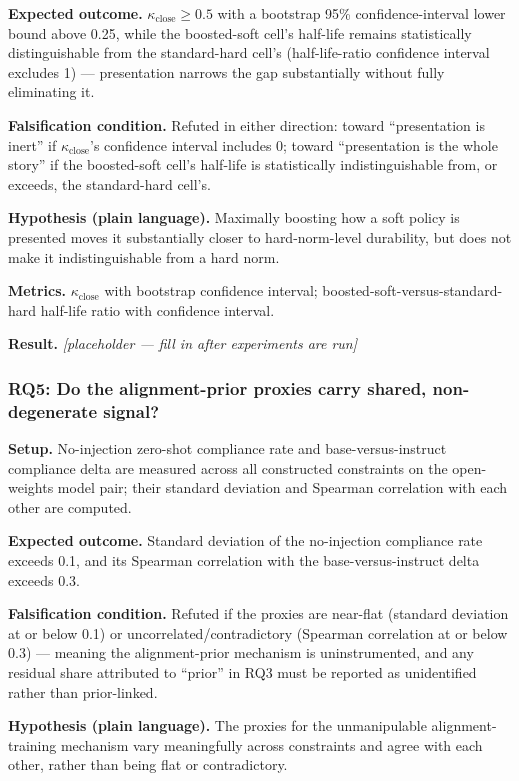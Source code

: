 \documentclass[11pt]{article}
\newcommand{\ph}{\textit{[placeholder --- fill in after experiments are run]}}
\begin{document}
\textbf{Expected outcome.} $\kappa_{\text{close}} \geq 0.5$ with a bootstrap 95\% confidence-interval lower bound above 0.25, while the boosted-soft cell's half-life remains statistically distinguishable from the standard-hard cell's (half-life-ratio confidence interval excludes 1) --- presentation narrows the gap substantially without fully eliminating it.

\textbf{Falsification condition.} Refuted in either direction: toward ``presentation is inert'' if $\kappa_{\text{close}}$'s confidence interval includes 0; toward ``presentation is the whole story'' if the boosted-soft cell's half-life is statistically indistinguishable from, or exceeds, the standard-hard cell's.

\textbf{Hypothesis (plain language).} Maximally boosting how a soft policy is presented moves it substantially closer to hard-norm-level durability, but does not make it indistinguishable from a hard norm.

\textbf{Metrics.} $\kappa_{\text{close}}$ with bootstrap confidence interval; boosted-soft-versus-standard-hard half-life ratio with confidence interval.

\textbf{Result.} \ph

\subsubsection{RQ5: Do the alignment-prior proxies carry shared, non-degenerate signal?}
\textbf{Setup.} No-injection zero-shot compliance rate and base-versus-instruct compliance delta are measured across all constructed constraints on the open-weights model pair; their standard deviation and Spearman correlation with each other are computed.

\textbf{Expected outcome.} Standard deviation of the no-injection compliance rate exceeds 0.1, and its Spearman correlation with the base-versus-instruct delta exceeds 0.3.

\textbf{Falsification condition.} Refuted if the proxies are near-flat (standard deviation at or below 0.1) or uncorrelated/contradictory (Spearman correlation at or below 0.3) --- meaning the alignment-prior mechanism is uninstrumented, and any residual share attributed to ``prior'' in RQ3 must be reported as unidentified rather than prior-linked.

\textbf{Hypothesis (plain language).} The proxies for the unmanipulable alignment-training mechanism vary meaningfully across constraints and agree with each other, rather than being flat or contradictory.
\end{document}

